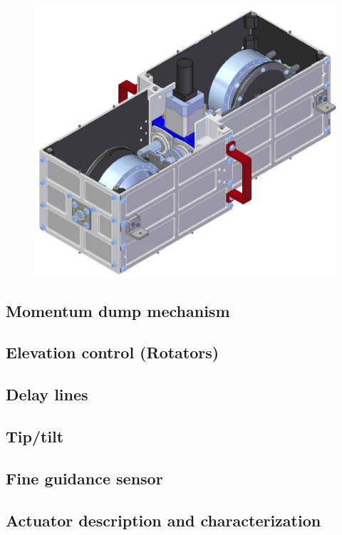 \begin{figure}[!ht]
	\centering
	\includegraphics[width=\textwidth]{Figures/CCMG-case.png}
	\caption{}
	\label{fig:CCMGcase}
    \end{figure}


\subsection{Momentum dump mechanism}
\label{subsec:chap3momdumpmotor}
\subsection{Elevation control (Rotators)}
\subsection{Delay lines}
\subsection{Tip/tilt}
\subsection{Fine guidance sensor}


\subsection{Actuator description and characterization}

